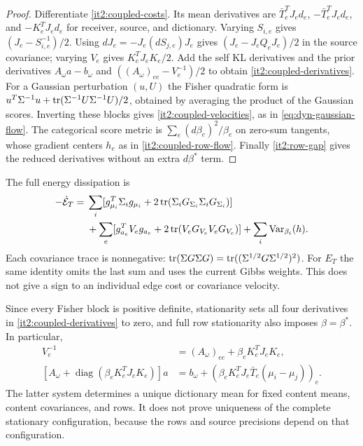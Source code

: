 \begin{proof}
Differentiate \cref{it2:coupled-costs}. Its mean derivatives are $\bar T_e^TJ_ed_e$, $-\bar T_e^TJ_ed_e$, and $-K_e^TJ_ed_e$ for receiver, source, and dictionary. Varying $S_{i,e}$ gives $(J_e-S_{i,e}^{-1})/2$. Using $dJ_e=-J_e(dS_{j,e})J_e$ gives $(J_e-J_eQ_eJ_e)/2$ in the source covariance; varying $V_e$ gives $K_e^TJ_eK_e/2$. Add the self KL derivatives and the prior derivatives $A_\omega a-b_\omega$ and $((A_\omega)_{ee}-V_e^{-1})/2$ to obtain \cref{it2:coupled-derivatives}. For a Gaussian perturbation $(u,U)$ the Fisher quadratic form is $u^T\Sigma^{-1}u+\operatorname{tr}(\Sigma^{-1}U\Sigma^{-1}U)/2$, obtained by averaging the product of the Gaussian scores. Inverting these blocks gives \cref{it2:coupled-velocities}, as in \cref{eq:dyn-gaussian-flow}. The categorical score metric is $\sum_e(d\beta_e)^2/\beta_e$ on zero-sum tangents, whose gradient centers $h_e$ as in \cref{it2:coupled-row-flow}. Finally \cref{it2:row-gap} gives the reduced derivatives without an extra $d\beta^*$ term.
\end{proof}

The full energy dissipation is
\begin{equation}
 \begin{aligned}
 -\dot{\mathcal E}_T={}&
 \sum_i[g_{\mu_i}^T\Sigma_i g_{\mu_i}
                  +2\operatorname{tr}(\Sigma_iG_{\Sigma_i}\Sigma_iG_{\Sigma_i})]\\
 &+\sum_e[g_{a_e}^TV_eg_{a_e}+2\operatorname{tr}(V_eG_{V_e}V_eG_{V_e})]
   +\sum_i\operatorname{Var}_{\beta_i}(h).
 \end{aligned}
 \label{it2:coupled-dissipation}
\end{equation}
Each covariance trace is nonnegative: $\operatorname{tr}(\Sigma G\Sigma G)=\operatorname{tr}((\Sigma^{1/2}G\Sigma^{1/2})^2)$. For $E_T$ the same identity omits the last sum and uses the current Gibbs weights. This does not give a sign to an individual edge cost or covariance velocity.

Since every Fisher block is positive definite, stationarity sets all four derivatives in \cref{it2:coupled-derivatives} to zero, and full row stationarity also imposes $\beta=\beta^*$. In particular,
\begin{equation}
 \begin{aligned}
 V_e^{-1}&=(A_\omega)_{ee}+\beta_eK_e^TJ_eK_e,\\
 [A_\omega+\operatorname{diag}(\beta_eK_e^TJ_eK_e)]a
 &=b_\omega+(\beta_eK_e^TJ_e\bar T_e(\mu_i-\mu_j))_e .
 \end{aligned}
 \label{it2:coupled-stationarity}
\end{equation}
The latter system determines a unique dictionary mean for fixed content means, content covariances, and rows. It does not prove uniqueness of the complete stationary configuration, because the rows and source precisions depend on that configuration.

